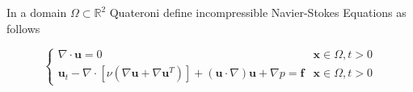 \documentclass[12pt,letterpaper]{article}
\begin{document}

In a domain $\Omega\subset \mathbb{R}^2$  Quateroni\cite{quarteroni2009numerical} 
define incompressible Navier-Stokes Equations as follows 

\begin{equation}
  \begin{cases}
     \nabla \cdot \textbf{u} = 0 & \textbf{x} \in \Omega , t > 0\\
     
     \textbf{u}_t - \nabla \cdot[\nu (\nabla \textbf{u} + \nabla \textbf{u}^T)] + (\textbf{u}\cdot \nabla)
     \textbf{u}+ \nabla p = \textbf{f} & \textbf{x} \in \Omega , t > 0
  
  \end{cases}
  \label{1}
\end{equation}\\
\end{document}
